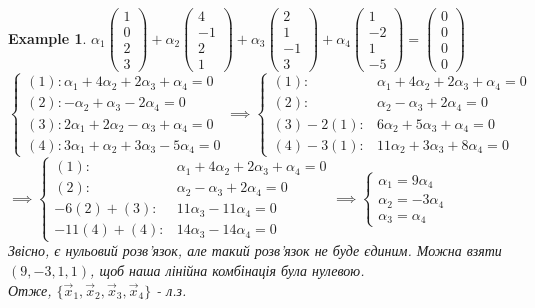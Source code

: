 \documentclass[a4paper, 10pt]{article}
\theoremstyle{theoremdd}
\newtheorem{example}[theorem]{Example}
\begin{document}
\begin{example}
	$\alpha_1 \begin{pmatrix} 1\\ 0\\ 2\\ 3 \end{pmatrix} + \alpha_2 \begin{pmatrix} 4\\ -1\\ 2\\ 1 \end{pmatrix} + \alpha_3 \begin{pmatrix} 2\\ 1\\ -1\\ 3 \end{pmatrix} + \alpha_4 \begin{pmatrix} 1\\ -2\\ 1\\ -5 \end{pmatrix} = \begin{pmatrix} 0\\ 0\\ 0\\ 0 \end{pmatrix}$\\
	$\begin{cases}
	(1): \alpha_1 + 4\alpha_2 + 2\alpha_3 + \alpha_4 = 0\\
	(2): -\alpha_2 + \alpha_3 - 2\alpha_4 = 0\\
	(3): 2\alpha_1 + 2\alpha_2 - \alpha_3 + \alpha_4 = 0\\
	(4): 3\alpha_1 + \alpha_2 + 3\alpha_3 - 5\alpha_4 = 0
	\end{cases} \implies \begin{cases}
	(1): & \alpha_1 + 4\alpha_2 + 2\alpha_3 + \alpha_4 = 0\\
	(2): & \alpha_2 - \alpha_3 + 2\alpha_4 = 0\\
	(3)-2(1): & 6\alpha_2 + 5\alpha_3 + \alpha_4 = 0\\
	(4)-3(1): & 11\alpha_2 + 3\alpha_3 + 8\alpha_4 = 0
	\end{cases}$\\
	
	$\implies \begin{cases}
	(1): & \alpha_1 + 4\alpha_2 + 2\alpha_3 + \alpha_4 = 0\\
	(2): & \alpha_2 - \alpha_3 + 2\alpha_4 = 0\\
	-6(2)+(3): & 11\alpha_3 - 11\alpha_4 = 0\\
	-11(4)+(4): & 14\alpha_3 - 14\alpha_4 = 0
	\end{cases} 
	\implies
	\begin{cases}
	\alpha_1 = 9\alpha_4\\
	\alpha_2 = -3\alpha_4\\
	\alpha_3 = \alpha_4
	\end{cases} 
	$\\
	Звісно, є нульовий розв'язок, але такий розв'язок не буде єдиним. Можна взяти $(9,-3,1,1)$, щоб наша лінійна комбінація була нулевою.\\
	Отже, $\{\vec{x}_1,\vec{x}_2,\vec{x}_3,\vec{x}_4\}$ - л.з.
	\end{example}
	
\end{document}
